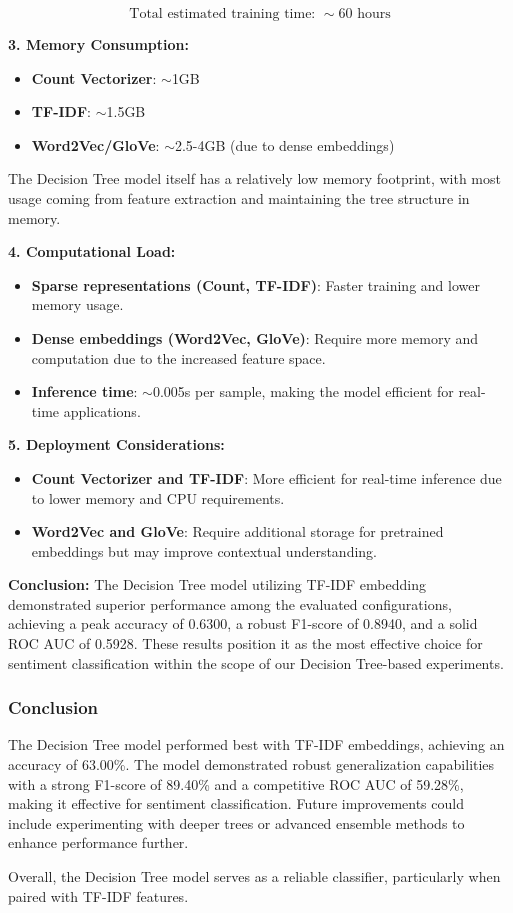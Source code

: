 \[
\text{Total estimated training time: } \sim 60 \text{ hours}
\]

\textbf{3. Memory Consumption:}  

\begin{itemize}
    \item \textbf{Count Vectorizer}: $\sim$1GB  
    \item \textbf{TF-IDF}: $\sim$1.5GB  
    \item \textbf{Word2Vec/GloVe}: $\sim$2.5-4GB (due to dense embeddings)  
\end{itemize}
The Decision Tree model itself has a relatively low memory footprint, with most usage coming from feature extraction and maintaining the tree structure in memory.  

\textbf{4. Computational Load:}  

\begin{itemize}
    \item \textbf{Sparse representations (Count, TF-IDF)}: Faster training and lower memory usage.  
    \item \textbf{Dense embeddings (Word2Vec, GloVe)}: Require more memory and computation due to the increased feature space.  
    \item \textbf{Inference time}: $\sim$0.005s per sample, making the model efficient for real-time applications.  
\end{itemize}

\textbf{5. Deployment Considerations:}  

\begin{itemize}
    \item \textbf{Count Vectorizer and TF-IDF}: More efficient for real-time inference due to lower memory and CPU requirements.  
    \item \textbf{Word2Vec and GloVe}: Require additional storage for pretrained embeddings but may improve contextual understanding.  
\end{itemize}

\textbf{Conclusion:} The Decision Tree model utilizing TF-IDF embedding demonstrated superior performance among the evaluated configurations, achieving a peak accuracy of 0.6300, a robust F1-score of 0.8940, and a solid ROC AUC of 0.5928. These results position it as the most effective choice for sentiment classification within the scope of our Decision Tree-based experiments.

\subsubsection{Conclusion}

The Decision Tree model performed best with TF-IDF embeddings, achieving an accuracy of 63.00\%. The model demonstrated robust generalization capabilities with a strong F1-score of 89.40\% and a competitive ROC AUC of 59.28\%, making it effective for sentiment classification. Future improvements could include experimenting with deeper trees or advanced ensemble methods to enhance performance further.

Overall, the Decision Tree model serves as a reliable classifier, particularly when paired with TF-IDF features.

\newpage 